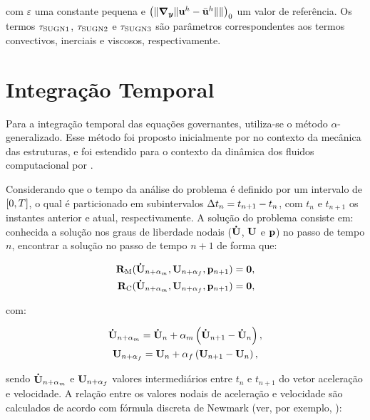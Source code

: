 \documentclass[tese_patricia]{subfiles}%
\begin{document}
\noindent com $\varepsilon$ uma constante pequena e $\left(\lVert \boldsymbol{\nabla_y} \lVert\mathbf{u}^h- \bar{\mathbf{u}}^h\rVert\rVert\right)_0$ um valor de referência. Os termos $\tau_{\mathrm{SUGN1}}$, $\tau_{\mathrm{SUGN2}}$ e $\tau_{\mathrm{SUGN3}}$ são parâmetros correspondentes aos termos convectivos, inerciais e viscosos, respectivamente.

\section{Integração Temporal}\label{capitulo:Cap2:IntegTemp}

Para a integração temporal das equações governantes, utiliza-se o método $\alpha$-generalizado. Esse método foi proposto inicialmente por  no contexto da mecânica das estruturas, e foi estendido para o contexto da dinâmica dos fluidos computacional por .

Considerando que o tempo da análise do problema é definido por um intervalo de $[0,T]$, o qual é particionado em subintervalos $\Delta t_{n} = t_{n+1} - t_{n}$, com $t_{n}$ e $t_{n+1}$ os instantes anterior e atual, respectivamente. A solução do problema consiste em: conhecida a solução nos graus de liberdade nodais ($\mathbf{\dot{U}}$, $\mathbf{U}$ e $\mathbf{p}$) no passo de tempo $n$, encontrar a solução no passo de tempo $n+1$ de forma que:

\begin{align}
\mathbf{R}_\mathrm{M}(\mathbf{\dot{U}}_{n+\alpha_m},\mathbf{U}_{n+\alpha_f},\mathbf{p}_{n+1}) = \mathbf{0}, \label{eq:resid_QM_alpha}\\
\mathbf{R}_\mathrm{C}(\mathbf{\dot{U}}_{n+\alpha_m},\mathbf{U}_{n+\alpha_f},\mathbf{p}_{n+1}) = \mathbf{0}, \label{eq:resid_cont_alpha}
\end{align}

\noindent com:

\begin{gather}
\mathbf{\dot{U}}_{n+\alpha_m} = \mathbf{\dot{U}}_n + \alpha_m \left( \mathbf{\dot{U}}_{n+1} - \mathbf{\dot{U}}_n \right), \label{eq:inter_acel}\\
\mathbf{U}_{n+\alpha_f} = \mathbf{U}_n + \alpha_f \left( \mathbf{U}_{n+1} - \mathbf{U}_n \right), \label{eq:inter_vel}
\end{gather}

\noindent sendo $\mathbf{\dot{U}}_{n+\alpha_m}$ e $\mathbf{U}_{n+\alpha_f}$ valores intermediários entre $t_{n}$ e $t_{n+1}$ do vetor aceleração e velocidade. A relação entre os valores nodais de aceleração e velocidade são calculados de acordo com fórmula discreta de Newmark (ver, por exemplo, \cite{Hughes:1976}):
\end{document}
